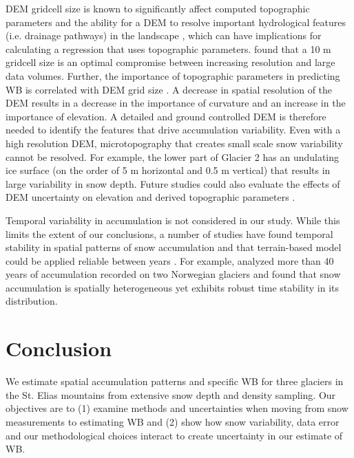 \documentclass{sfuthesis}
\begin{document}
DEM gridcell size is known to significantly affect computed topographic parameters and the ability for a DEM to resolve important hydrological features (i.e. drainage pathways) in the landscape \citep{Zhang1994, Garbrecht1994, Guo-an2001, Lopez2010}, which can have implications for calculating a regression that uses topographic parameters.  \cite{Zhang1994} found that a 10 m gridcell size is an optimal compromise between increasing resolution and large data volumes. Further, the importance of topographic parameters in predicting WB is correlated with DEM grid size \citep[e.g.][]{Kienzle2004, Lopez2010}. A decrease in spatial resolution of the DEM results in a decrease in the importance of curvature and an increase in the importance of elevation. A detailed and ground controlled DEM is therefore needed to identify the features that drive accumulation variability. Even with a high resolution DEM, microtopography that creates small scale snow variability cannot be resolved. For example, the lower part of Glacier 2 has an undulating ice surface (on the order of 5 m horizontal and 0.5 m vertical) that results in large variability in snow depth. Future studies could also evaluate the effects of DEM uncertainty on elevation and derived topographic parameters \citep [e.g.][]{Guo-an2001, Wechsler2006}. 

Temporal variability in accumulation is not considered in our study. While this limits the extent of our conclusions, a number of studies have found temporal stability in spatial patterns of snow accumulation and that terrain-based model could be applied reliable between years \citep[e.g.][]{Grunewald2013}. For example, \cite{Walmsley2015} analyzed more than 40 years of accumulation recorded on two Norwegian glaciers and found that snow accumulation is spatially heterogeneous yet exhibits robust time stability in its distribution. 

\section{Conclusion}

We estimate spatial accumulation patterns and specific WB for three glaciers in the St. Elias mountains from extensive snow depth and density sampling. Our objectives are to (1) examine methods and uncertainties when moving from snow measurements to estimating WB and (2) show how snow variability, data error and our methodological choices interact to create uncertainty in our estimate of WB.
\end{document}
